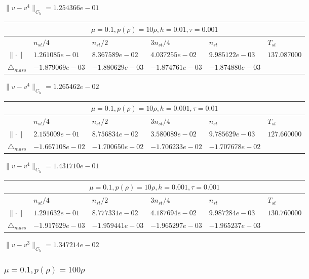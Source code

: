 $\|v-v^{4}\|_{C_h} = 1.254366e-01$

\begin{tabular}{*{6}{|l}|}
    \hline
     \\
    \hline
    &$n_{st}/4 $&$ n_{st}/2$&$3n_{st}/4$&$n_{st}$&$T_{st}$ \\
    \hline
$\|\cdot \|$& $1.261085e-01$ & $8.367589e-02$ & $4.037255e-02$ & $9.985122e-03$ &$137.087000$\\
\hline
$\triangle_{mass}$& $-1.879069e-03$ & $-1.880629e-03$ & $-1.874761e-03$ & $-1.874880e-03$ &\\
\hline
\end{tabular}

$\|v-v^{4}\|_{C_h} = 1.265462e-02$

\begin{tabular}{*{6}{|l}|}
    \hline
     \\
    \hline
    &$n_{st}/4 $&$ n_{st}/2$&$3n_{st}/4$&$n_{st}$&$T_{st}$ \\
    \hline
    $\|\cdot \|$& $2.155009e-01$ & $8.756834e-02$ & $3.580089e-02$ & $9.785629e-03$ &$127.660000$\\
\hline
$\triangle_{mass}$& $-1.667108e-02$ & $-1.700650e-02$ & $-1.706233e-02$ & $-1.707678e-02$ &\\
\hline
\end{tabular}

$\|v-v^{4}\|_{C_h} = 1.431710e-01$

\begin{tabular}{*{6}{|l}|}
    \hline
     \\
    \hline
    &$n_{st}/4 $&$ n_{st}/2$&$3n_{st}/4$&$n_{st}$&$T_{st}$ \\
    \hline
$\|\cdot \|$& $1.291632e-01$ & $8.777331e-02$ & $4.187694e-02$ & $9.987284e-03$ &$130.760000$\\
\hline
$\triangle_{mass}$& $-1.917629e-03$ & $-1.959441e-03$ & $-1.965297e-03$ & $-1.965237e-03$ &\\
\hline
\end{tabular}

$\|v-v^{3}\|_{C_h} = 1.347214e-02$

\subsubsection{$\mu = 0.1, p(\rho) = 100\rho $}

